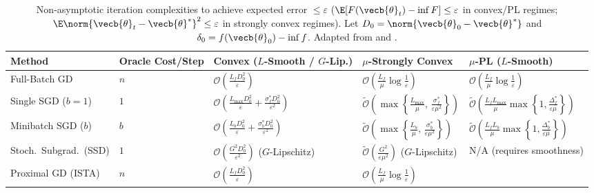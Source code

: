 \documentclass[../../../../master.tex]{subfiles}
\begin{document}
\begin{table}[htbp]
\centering
\caption{Non-asymptotic iteration complexities to achieve expected error $\le \varepsilon$ ($\E[F(\vecb{\theta}_t) - \inf F] \le \varepsilon$ in convex/PL regimes; $\E\norm{\vecb{\theta}_t - \vecb{\theta}^*}^2 \le \varepsilon$ in strongly convex regimes). Let $D_0 = \norm{\vecb{\theta}_0 - \vecb{\theta}^*}$ and $\delta_0 = f(\vecb{\theta}_0) - \inf f$. Adapted from  and .}
\label{tab:sgd:complexity}
\footnotesize
\renewcommand{\arraystretch}{1.28}
\begin{tabularx}{\textwidth}{@{}>{\raggedright\arraybackslash}p{2.25cm} >{\raggedright\arraybackslash}p{1.85cm} >{\raggedright\arraybackslash}p{3.15cm} >{\raggedright\arraybackslash}p{3.30cm} >{\raggedright\arraybackslash}X@{}}
\toprule
\textbf{Method} & \textbf{Oracle Cost/Step} & \textbf{Convex ($L$-Smooth / $G$-Lip.)} & \textbf{$\mu$-Strongly Convex} & \textbf{$\mu$-PL ($L$-Smooth)} \\
\midrule
Full-Batch GD &
$n$ &
$\mathcal{O}\!\left(\frac{L_f D_0^2}{\varepsilon}\right)$ &
$\mathcal{O}\!\left(\frac{L_f}{\mu}\log\frac{1}{\varepsilon}\right)$ &
$\mathcal{O}\!\left(\frac{L_f}{\mu}\log\frac{1}{\varepsilon}\right)$ \\
Single SGD ($b=1$) &
$1$ &
$\mathcal{O}\!\left(\frac{L_{\max}D_0^2}{\varepsilon} + \frac{\sigma_f^* D_0^2}{\varepsilon^2}\right)$ &
$\tilde{\mathcal{O}}\!\left(\max\!\left\{\frac{L_{\max}}{\mu},\, \frac{\sigma_f^*}{\varepsilon\mu^2}\right\}\right)$ &
$\tilde{\mathcal{O}}\!\left(\frac{L_f L_{\max}}{\mu}\max\!\left\{1, \frac{\Delta_f^*}{\varepsilon\mu}\right\}\right)$ \\
Minibatch SGD ($b$) &
$b$ &
$\mathcal{O}\!\left(\frac{L_b D_0^2}{\varepsilon} + \frac{\sigma_b^* D_0^2}{\varepsilon^2}\right)$ &
$\tilde{\mathcal{O}}\!\left(\max\!\left\{\frac{L_b}{\mu},\, \frac{\sigma_b^*}{\varepsilon\mu^2}\right\}\right)$ &
$\tilde{\mathcal{O}}\!\left(\frac{L_f L_b}{\mu}\max\!\left\{1, \frac{\Delta_b^*}{\varepsilon\mu}\right\}\right)$ \\
Stoch.\ Subgrad.\ (SSD) &
$1$ &
$\mathcal{O}\!\left(\frac{G^2 D_0^2}{\varepsilon^2}\right)$ ($G$-Lipschitz) &
$\tilde{\mathcal{O}}\!\left(\frac{G^2}{\varepsilon\mu^2}\right)$ ($G$-Lipschitz) &
N/A (requires smoothness) \\
Proximal GD (ISTA) &
$n$ &
$\mathcal{O}\!\left(\frac{L_f D_0^2}{\varepsilon}\right)$ &
$\mathcal{O}\!\left(\frac{L_f}{\mu}\log\frac{1}{\varepsilon}\right)$ &

\end{tabularx}
\end{table}
\end{document}
